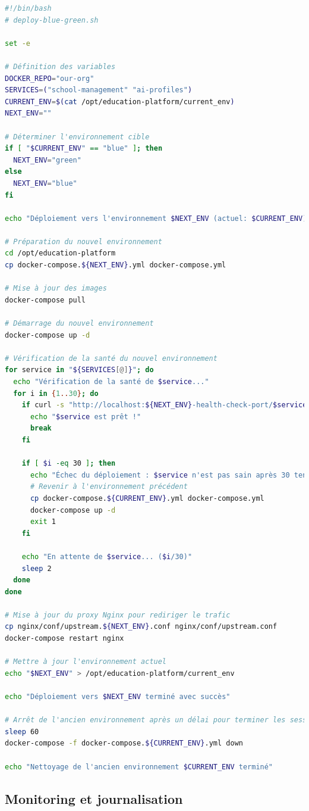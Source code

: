 \begin{lstlisting}[style=codestyle, language=bash]
#!/bin/bash
# deploy-blue-green.sh

set -e

# Définition des variables
DOCKER_REPO="our-org"
SERVICES=("school-management" "ai-profiles")
CURRENT_ENV=$(cat /opt/education-platform/current_env)
NEXT_ENV=""

# Déterminer l'environnement cible
if [ "$CURRENT_ENV" == "blue" ]; then
  NEXT_ENV="green"
else
  NEXT_ENV="blue"
fi

echo "Déploiement vers l'environnement $NEXT_ENV (actuel: $CURRENT_ENV)"

# Préparation du nouvel environnement
cd /opt/education-platform
cp docker-compose.${NEXT_ENV}.yml docker-compose.yml

# Mise à jour des images
docker-compose pull

# Démarrage du nouvel environnement
docker-compose up -d

# Vérification de la santé du nouvel environnement
for service in "${SERVICES[@]}"; do
  echo "Vérification de la santé de $service..."
  for i in {1..30}; do
    if curl -s "http://localhost:${NEXT_ENV}-health-check-port/$service/health" | grep -q "ok"; then
      echo "$service est prêt !"
      break
    fi
    
    if [ $i -eq 30 ]; then
      echo "Échec du déploiement : $service n'est pas sain après 30 tentatives"
      # Revenir à l'environnement précédent
      cp docker-compose.${CURRENT_ENV}.yml docker-compose.yml
      docker-compose up -d
      exit 1
    fi
    
    echo "En attente de $service... ($i/30)"
    sleep 2
  done
done

# Mise à jour du proxy Nginx pour rediriger le trafic
cp nginx/conf/upstream.${NEXT_ENV}.conf nginx/conf/upstream.conf
docker-compose restart nginx

# Mettre à jour l'environnement actuel
echo "$NEXT_ENV" > /opt/education-platform/current_env

echo "Déploiement vers $NEXT_ENV terminé avec succès"

# Arrêt de l'ancien environnement après un délai pour terminer les sessions en cours
sleep 60
docker-compose -f docker-compose.${CURRENT_ENV}.yml down

echo "Nettoyage de l'ancien environnement $CURRENT_ENV terminé"
\end{lstlisting}

\subsection{Monitoring et journalisation}

